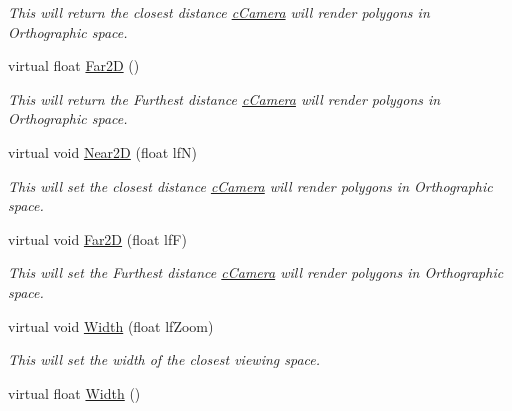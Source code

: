 \begin{DoxyCompactItemize}
\begin{DoxyCompactList}\small\item\em This will return the closest distance \hyperlink{classc_camera}{cCamera} will render polygons in Orthographic space. \end{DoxyCompactList}\item 
\hypertarget{classc_perspective_control_a0acd5b79c090814ee300e68a39d742ee}{
virtual float \hyperlink{classc_perspective_control_a0acd5b79c090814ee300e68a39d742ee}{Far2D} ()}
\label{classc_perspective_control_a0acd5b79c090814ee300e68a39d742ee}

\begin{DoxyCompactList}\small\item\em This will return the Furthest distance \hyperlink{classc_camera}{cCamera} will render polygons in Orthographic space. \end{DoxyCompactList}\item 
\hypertarget{classc_perspective_control_ae2beedc86ad1003705ae54f0127ca049}{
virtual void \hyperlink{classc_perspective_control_ae2beedc86ad1003705ae54f0127ca049}{Near2D} (float lfN)}
\label{classc_perspective_control_ae2beedc86ad1003705ae54f0127ca049}

\begin{DoxyCompactList}\small\item\em This will set the closest distance \hyperlink{classc_camera}{cCamera} will render polygons in Orthographic space. \end{DoxyCompactList}\item 
\hypertarget{classc_perspective_control_a6cf6d8072de5e8c5b4e54a79ad1f0e25}{
virtual void \hyperlink{classc_perspective_control_a6cf6d8072de5e8c5b4e54a79ad1f0e25}{Far2D} (float lfF)}
\label{classc_perspective_control_a6cf6d8072de5e8c5b4e54a79ad1f0e25}

\begin{DoxyCompactList}\small\item\em This will set the Furthest distance \hyperlink{classc_camera}{cCamera} will render polygons in Orthographic space. \end{DoxyCompactList}\item 
\hypertarget{classc_perspective_control_add5f74b61fe689841d0de7cfcaad56f9}{
virtual void \hyperlink{classc_perspective_control_add5f74b61fe689841d0de7cfcaad56f9}{Width} (float lfZoom)}
\label{classc_perspective_control_add5f74b61fe689841d0de7cfcaad56f9}

\begin{DoxyCompactList}\small\item\em This will set the width of the closest viewing space. \end{DoxyCompactList}\item 
\hypertarget{classc_perspective_control_a9c22ac8a598cf9c6c732bb4fbb5bd333}{
virtual float \hyperlink{classc_perspective_control_a9c22ac8a598cf9c6c732bb4fbb5bd333}{Width} ()}
\label{classc_perspective_control_a9c22ac8a598cf9c6c732bb4fbb5bd333}


\end{DoxyCompactItemize}

